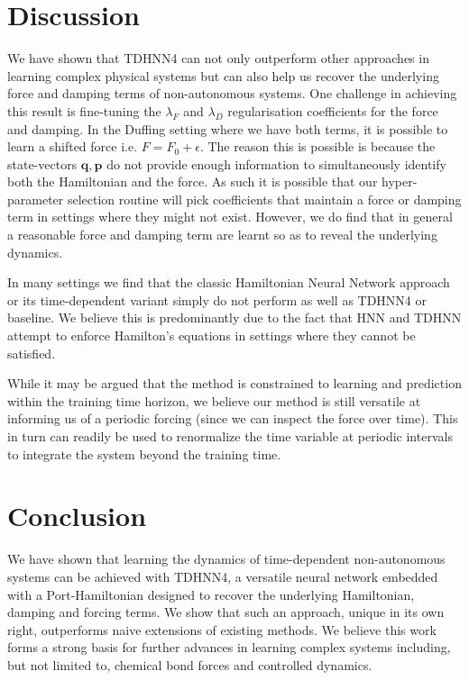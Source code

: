 \documentclass{article}
\begin{document}
\section{Discussion}

We have shown that TDHNN4 can not only outperform other approaches in learning complex physical systems but can also help us recover the underlying force and damping terms of non-autonomous systems. One challenge in achieving this result is fine-tuning the $\lambda_F$ and $\lambda_D$ regularisation coefficients for the force and damping. In the Duffing setting where we have both terms, it is possible to learn a shifted force i.e. $F = F_0 + \epsilon$. The reason this is possible is because the state-vectors $\mathbf{q},\mathbf{p}$ do not provide enough information to simultaneously identify both the Hamiltonian and the force. As such it is possible that our hyper-parameter selection routine will pick coefficients that maintain a force or damping term in settings where they might not exist. However, we do find that in general a reasonable force and damping term are learnt so as to reveal the underlying dynamics.


In many settings we find that the classic Hamiltonian Neural Network approach or its time-dependent variant simply do not perform as well as TDHNN4 or baseline. We believe this is predominantly due to the fact that HNN and TDHNN attempt to enforce Hamilton's equations in settings where they cannot be satisfied.

While it may be argued that the method is constrained to learning and prediction within the training time horizon, we believe our method is still versatile at informing us of a periodic forcing (since we can inspect the force over time). This in turn can readily be used to renormalize the time variable at periodic intervals to integrate the system beyond the training time.

\section{Conclusion}

We have shown that learning the dynamics of time-dependent non-autonomous systems can be achieved with TDHNN4, a versatile neural network embedded with a Port-Hamiltonian designed to recover the underlying Hamiltonian, damping and forcing terms. We show that such an approach, unique in its own right, outperforms naive extensions of existing methods. We believe this work forms a strong basis for further advances in learning complex systems including, but not limited to, chemical bond forces and controlled dynamics. 



\pagebreak


\end{document}
